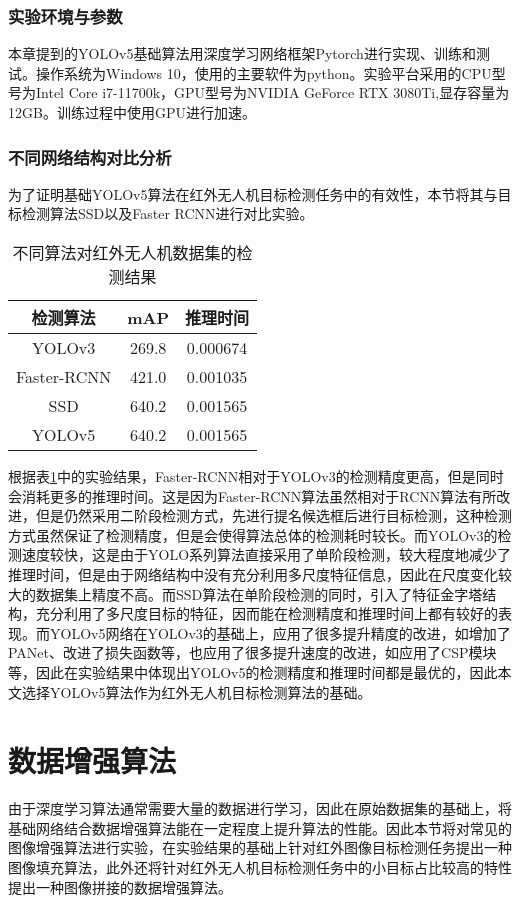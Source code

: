 \subsubsection{实验环境与参数}
本章提到的YOLOv5基础算法用深度学习网络框架Pytorch进行实现、训练和测试。操作系统为Windows 10，使用的主要软件为python。实验平台采用的CPU型号为Intel Core i7-11700k，GPU型号为NVIDIA GeForce RTX 3080Ti,显存容量为12GB。训练过程中使用GPU进行加速。

\subsubsection{不同网络结构对比分析}
为了证明基础YOLOv5算法在红外无人机目标检测任务中的有效性，本节将其与目标检测算法SSD以及Faster RCNN进行对比实验。

\begin{table}[htbp]
  \caption{不同算法对红外无人机数据集的检测结果}
  \vspace{0.5em}\centering\wuhao
  \begin{tabular}{ccc}
  \toprule
  检测算法 & mAP & 推理时间\\
  \midrule
  YOLOv3 & 269.8 & 0.000674\\
  Faster-RCNN & 421.0 & 0.001035\\
  SSD & 640.2 & 0.001565\\
  YOLOv5 & 640.2 & 0.001565\\
  \bottomrule
  \end{tabular}
  \label{t1}
\end{table}

根据表\ref{t1}中的实验结果，Faster-RCNN相对于YOLOv3的检测精度更高，但是同时会消耗更多的推理时间。这是因为Faster-RCNN算法虽然相对于RCNN算法有所改进，但是仍然采用二阶段检测方式，先进行提名候选框后进行目标检测，这种检测方式虽然保证了检测精度，但是会使得算法总体的检测耗时较长。而YOLOv3的检测速度较快，这是由于YOLO系列算法直接采用了单阶段检测，较大程度地减少了推理时间，但是由于网络结构中没有充分利用多尺度特征信息，因此在尺度变化较大的数据集上精度不高。而SSD算法在单阶段检测的同时，引入了特征金字塔结构，充分利用了多尺度目标的特征，因而能在检测精度和推理时间上都有较好的表现。而YOLOv5网络在YOLOv3的基础上，应用了很多提升精度的改进，如增加了PANet、改进了损失函数等，也应用了很多提升速度的改进，如应用了CSP模块等，因此在实验结果中体现出YOLOv5的检测精度和推理时间都是最优的，因此本文选择YOLOv5算法作为红外无人机目标检测算法的基础。

\section{数据增强算法}
由于深度学习算法通常需要大量的数据进行学习，因此在原始数据集的基础上，将基础网络结合数据增强算法能在一定程度上提升算法的性能。因此本节将对常见的图像增强算法进行实验，在实验结果的基础上针对红外图像目标检测任务提出一种图像填充算法，此外还将针对红外无人机目标检测任务中的小目标占比较高的特性提出一种图像拼接的数据增强算法。

